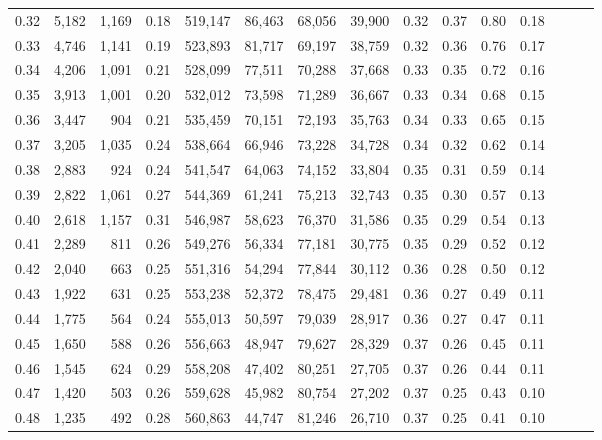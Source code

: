 \begin{tabular}{rrrrrrrrrrrrrrr}
0.32 &   5,182 &  1,169 &  0.18 &  519,147 &   86,463 &   68,056 &   39,900 &  0.32 &  0.37 &  0.80 &      0.18 \\
0.33 &   4,746 &  1,141 &  0.19 &  523,893 &   81,717 &   69,197 &   38,759 &  0.32 &  0.36 &  0.76 &      0.17 \\
0.34 &   4,206 &  1,091 &  0.21 &  528,099 &   77,511 &   70,288 &   37,668 &  0.33 &  0.35 &  0.72 &      0.16 \\
0.35 &   3,913 &  1,001 &  0.20 &  532,012 &   73,598 &   71,289 &   36,667 &  0.33 &  0.34 &  0.68 &      0.15 \\
0.36 &   3,447 &    904 &  0.21 &  535,459 &   70,151 &   72,193 &   35,763 &  0.34 &  0.33 &  0.65 &      0.15 \\
0.37 &   3,205 &  1,035 &  0.24 &  538,664 &   66,946 &   73,228 &   34,728 &  0.34 &  0.32 &  0.62 &      0.14 \\
0.38 &   2,883 &    924 &  0.24 &  541,547 &   64,063 &   74,152 &   33,804 &  0.35 &  0.31 &  0.59 &      0.14 \\
0.39 &   2,822 &  1,061 &  0.27 &  544,369 &   61,241 &   75,213 &   32,743 &  0.35 &  0.30 &  0.57 &      0.13 \\
0.40 &   2,618 &  1,157 &  0.31 &  546,987 &   58,623 &   76,370 &   31,586 &  0.35 &  0.29 &  0.54 &      0.13 \\
0.41 &   2,289 &    811 &  0.26 &  549,276 &   56,334 &   77,181 &   30,775 &  0.35 &  0.29 &  0.52 &      0.12 \\
0.42 &   2,040 &    663 &  0.25 &  551,316 &   54,294 &   77,844 &   30,112 &  0.36 &  0.28 &  0.50 &      0.12 \\
0.43 &   1,922 &    631 &  0.25 &  553,238 &   52,372 &   78,475 &   29,481 &  0.36 &  0.27 &  0.49 &      0.11 \\
0.44 &   1,775 &    564 &  0.24 &  555,013 &   50,597 &   79,039 &   28,917 &  0.36 &  0.27 &  0.47 &      0.11 \\
0.45 &   1,650 &    588 &  0.26 &  556,663 &   48,947 &   79,627 &   28,329 &  0.37 &  0.26 &  0.45 &      0.11 \\
0.46 &   1,545 &    624 &  0.29 &  558,208 &   47,402 &   80,251 &   27,705 &  0.37 &  0.26 &  0.44 &      0.11 \\
0.47 &   1,420 &    503 &  0.26 &  559,628 &   45,982 &   80,754 &   27,202 &  0.37 &  0.25 &  0.43 &      0.10 \\
0.48 &   1,235 &    492 &  0.28 &  560,863 &   44,747 &   81,246 &   26,710 &  0.37 &  0.25 &  0.41 &      0.10 \\

\end{tabular}
